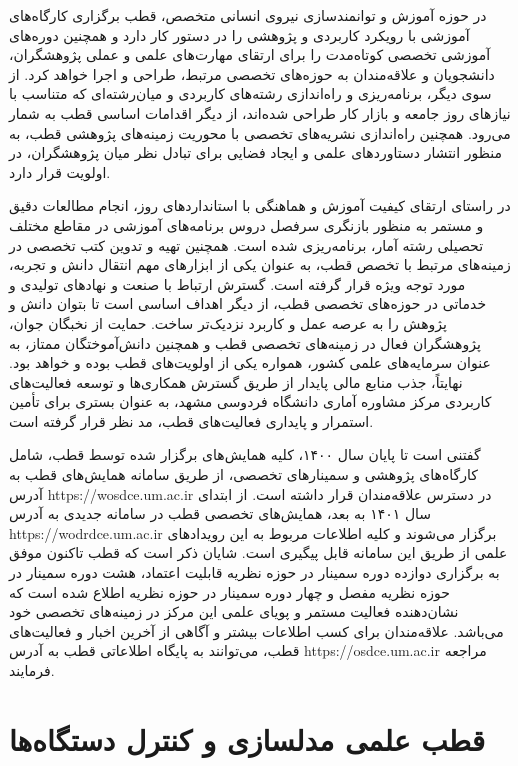 \documentclass[
  letterpaper,
  DIV=11,
  numbers=noendperiod]{scrreprt}
\begin{document}
در حوزه آموزش و توانمندسازی نیروی انسانی متخصص، قطب برگزاری کارگاه‌های
آموزشی با رویکرد کاربردی و پژوهشی را در دستور کار دارد و همچنین دوره‌های
آموزشی تخصصی کوتاه‌مدت را برای ارتقای مهارت‌های علمی و عملی پژوهشگران،
دانشجویان و علاقه‌مندان به حوزه‌های تخصصی مرتبط، طراحی و اجرا خواهد کرد.
از سوی دیگر، برنامه‌ریزی و راه‌اندازی رشته‌های کاربردی و میان‌رشته‌ای که
متناسب با نیازهای روز جامعه و بازار کار طراحی شده‌اند، از دیگر اقدامات
اساسی قطب به شمار می‌رود. همچنین راه‌اندازی نشریه‌های تخصصی با محوریت
زمینه‌های پژوهشی قطب، به منظور انتشار دستاوردهای علمی و ایجاد فضایی برای
تبادل نظر میان پژوهشگران، در اولویت قرار دارد.

در راستای ارتقای کیفیت آموزش و هماهنگی با استانداردهای روز، انجام
مطالعات دقیق و مستمر به منظور بازنگری سرفصل دروس برنامه‌های آموزشی در
مقاطع مختلف تحصیلی رشته آمار، برنامه‌ریزی شده است. همچنین تهیه و تدوین
کتب تخصصی در زمینه‌های مرتبط با تخصص قطب، به عنوان یکی از ابزارهای مهم
انتقال دانش و تجربه، مورد توجه ویژه قرار گرفته است. گسترش ارتباط با صنعت
و نهادهای تولیدی و خدماتی در حوزه‌های تخصصی قطب، از دیگر اهداف اساسی است
تا بتوان دانش و پژوهش را به عرصه عمل و کاربرد نزدیک‌تر ساخت. حمایت از
نخبگان جوان، پژوهشگران فعال در زمینه‌های تخصصی قطب و همچنین دانش‌آموختگان
ممتاز، به عنوان سرمایه‌های علمی کشور، همواره یکی از اولویت‌های قطب بوده و
خواهد بود. نهایتاً، جذب منابع مالی پایدار از طریق گسترش همکاری‌ها و توسعه
فعالیت‌های کاربردی مرکز مشاوره آماری دانشگاه فردوسی مشهد، به عنوان بستری
برای تأمین استمرار و پایداری فعالیت‌های قطب، مد نظر قرار گرفته است.

گفتنی است تا پایان سال ۱۴۰۰، کلیه همایش‌های برگزار شده توسط قطب، شامل
کارگاه‌های پژوهشی و سمینارهای تخصصی، از طریق سامانه همایش‌های قطب به آدرس
https://wosdce.um.ac.ir در دسترس علاقه‌مندان قرار داشته است. از ابتدای
سال ۱۴۰۱ به بعد، همایش‌های تخصصی قطب در سامانه جدیدی به آدرس
https://wodrdce.um.ac.ir برگزار می‌شوند و کلیه اطلاعات مربوط به این
رویدادهای علمی از طریق این سامانه قابل پیگیری است. شایان ذکر است که قطب
تاکنون موفق به برگزاری دوازده دوره سمینار در حوزه نظریه قابلیت اعتماد،
هشت دوره سمینار در حوزه نظریه مفصل و چهار دوره سمینار در حوزه نظریه
اطلاع شده است که نشان‌دهنده فعالیت مستمر و پویای علمی این مرکز در
زمینه‌های تخصصی خود می‌باشد. علاقه‌مندان برای کسب اطلاعات بیشتر و آگاهی از
آخرین اخبار و فعالیت‌های قطب، می‌توانند به پایگاه اطلاعاتی قطب به آدرس
https://osdce.um.ac.ir مراجعه فرمایند.

\section{قطب علمی مدلسازی و کنترل
دستگاه‌ها}\label{ux642ux637ux628-ux639ux644ux645ux6cc-ux645ux62fux644ux633ux627ux632ux6cc-ux648-ux6a9ux646ux62aux631ux644-ux62fux633ux62aux6afux627ux647ux647ux627}
\end{document}
